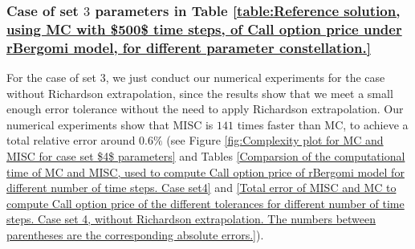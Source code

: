 \FloatBarrier
\subsubsection{Case of set $3$ parameters in Table \ref{table:Reference solution, using MC with $500$ time steps, of Call option price under rBergomi model, for different parameter constellation.}}\label{sec:Case of set 4 parameters}


For the case of set $3$, we just conduct our numerical experiments for the case without Richardson extrapolation, since the results show that we meet a small enough error tolerance without the need to apply   Richardson extrapolation.  Our numerical experiments show that MISC is  $141$ times faster than MC, to achieve a total relative error around $0.6\%$ (see Figure \ref{fig:Complexity plot for MC and MISC for case set $4$ parameters} and Tables \ref{Comparsion of the computational time of  MC and MISC, used to compute Call option price of rBergomi model for different number of time steps. Case set4} and \ref{Total error of MISC and MC to compute Call option price of the different tolerances for different number of time steps. Case set 4, without Richardson extrapolation. The numbers between parentheses are the corresponding absolute errors.}).

